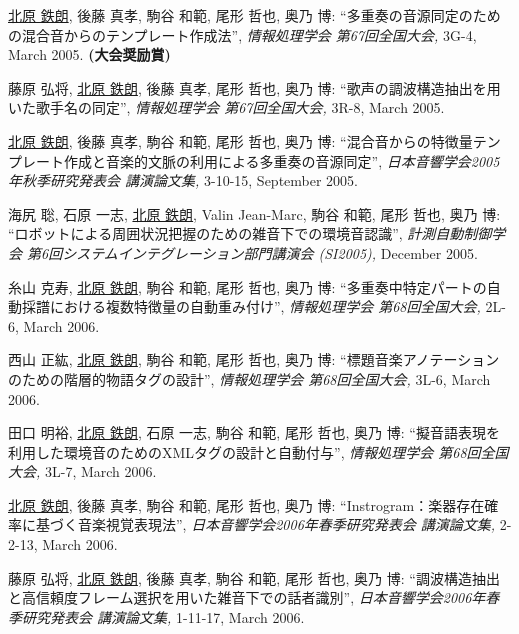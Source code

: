 \begin{Enumerate}
\item 
\underline{北原 鉄朗}, 
後藤 真孝, 
駒谷
      和範, 
尾形 哲也, 
奥乃 博: 
    ``多重奏の音源同定のための混合音からのテンプレート作成法'', 
    {\it 情報処理学会 第67回全国大会,} 3G-4, March 2005. 
{\bf (大会奨励賞)}
\item 
藤原
      弘将, 
\underline{北原 鉄朗}, 
後藤
      真孝, 
尾形 哲也, 
奥乃 博: 
    ``歌声の調波構造抽出を用いた歌手名の同定'', 
    {\it 情報処理学会 第67回全国大会,} 3R-8, March 2005. 

\item 
\underline{北原 鉄朗}, 
後藤 真孝, 
駒谷
      和範, 
尾形 哲也, 
奥乃 博: 
    ``混合音からの特徴量テンプレート作成と音楽的文脈の利用による多重奏の音源同定'', 
    {\it 日本音響学会2005年秋季研究発表会 講演論文集,} 3-10-15, September 2005. 

\item 
海尻 聡, 
石原 一志, 
\underline{北原 鉄朗}, 
Valin Jean-Marc, 
駒谷
      和範, 
尾形 哲也, 
奥乃 博: 
    ``ロボットによる周囲状況把握のための雑音下での環境音認識'', 
    {\it 計測自動制御学会 第6回システムインテグレーション部門講演会 (SI2005),
    } December 2005. 

\item 
糸山 克寿, 
\underline{北原 鉄朗}, 
駒谷
      和範, 
尾形 哲也, 
奥乃 博: 
    ``多重奏中特定パートの自動採譜における複数特徴量の自動重み付け'', 
    {\it 情報処理学会 第68回全国大会,} 2L-6, March 2006. 

\item 
西山 正紘, 
\underline{北原 鉄朗}, 
駒谷
      和範, 
尾形 哲也, 
奥乃 博: 
    ``標題音楽アノテーションのための階層的物語タグの設計'', 
    {\it 情報処理学会 第68回全国大会,} 3L-6, March 2006. 

\item 
田口 明裕, 
\underline{北原 鉄朗}, 
石原 一志, 
駒谷
      和範, 
尾形 哲也, 
奥乃 博: 
    ``擬音語表現を利用した環境音のためのXMLタグの設計と自動付与'', 
    {\it 情報処理学会 第68回全国大会,} 3L-7, March 2006. 

\item 
\underline{北原 鉄朗}, 
後藤
      真孝, 
駒谷
      和範, 
尾形 哲也, 
奥乃 博: 
    ``Instrogram：楽器存在確率に基づく音楽視覚表現法'', 
    {\it 日本音響学会2006年春季研究発表会 講演論文集,} 2-2-13, March 2006. 

\item 
藤原
      弘将, 
\underline{北原 鉄朗}, 
後藤
      真孝, 
駒谷
      和範, 
尾形 哲也, 
奥乃 博: 
    ``調波構造抽出と高信頼度フレーム選択を用いた雑音下での話者識別'', 
    {\it 日本音響学会2006年春季研究発表会 講演論文集,} 1-11-17, March 2006. 


\end{Enumerate}
